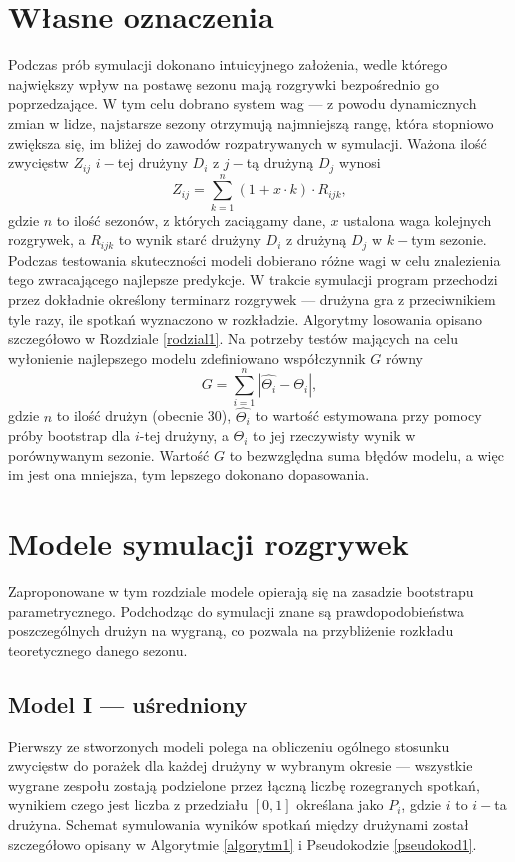 \documentclass[inzynierska]{pwr_wmat_praca_dyplomowa}
\theoremstyle{plain}
\numberwithin{theorem}{chapter}
\theoremstyle{definition}
\numberwithin{theorem}{chapter}
\begin{document}
\section{Własne oznaczenia} \label{wlasne_oznaczenia}
Podczas prób symulacji dokonano intuicyjnego założenia, wedle którego największy wpływ na postawę sezonu mają rozgrywki bezpośrednio go poprzedzające. W tym celu dobrano system wag --- z powodu dynamicznych zmian w lidze, najstarsze sezony otrzymują najmniejszą rangę, która stopniowo zwiększa się, im bliżej do zawodów rozpatrywanych w symulacji. Ważona ilość zwycięstw $Z_{ij}$ $i-$tej drużyny $D_i$ z $j-$tą drużyną $D_j$ wynosi
\begin{equation}
	Z_{ij} = \sum_{k=1}^{n} (1+x\cdot k)\cdot R_{ijk}, 
\end{equation}
gdzie $n$ to ilość sezonów, z których zaciągamy dane, $x$ ustalona waga kolejnych rozgrywek, a $R_{ijk}$ to wynik starć drużyny $D_i$ z drużyną $D_j$ w $k-$tym sezonie. Podczas testowania skuteczności modeli dobierano różne wagi w celu znalezienia tego zwracającego najlepsze predykcje. W trakcie symulacji program przechodzi przez dokładnie określony terminarz rozgrywek --- drużyna gra z przeciwnikiem tyle razy, ile spotkań wyznaczono w rozkładzie. Algorytmy losowania opisano szczegółowo w Rozdziale \ref{rodzial1}. 
Na potrzeby testów mających na celu wyłonienie najlepszego modelu zdefiniowano współczynnik $G$ równy
\begin{equation}\label{wskaznik_g}
	G = \sum_{i=1}^{n}|\hat{\Theta_i} - \Theta_i|,
\end{equation}
gdzie $n$ to ilość drużyn (obecnie 30), $\hat{\Theta_i}$ to wartość estymowana przy pomocy próby bootstrap dla $i$-tej drużyny, a $\Theta_i$ to jej rzeczywisty wynik w porównywanym sezonie. Wartość $G$ to bezwzględna suma błędów modelu, a więc im jest ona mniejsza, tym lepszego dokonano dopasowania. 

\section{Modele symulacji rozgrywek}
Zaproponowane w tym rozdziale modele opierają się na zasadzie bootstrapu parametrycznego. Podchodząc do symulacji znane są prawdopodobieństwa poszczególnych drużyn na wygraną, co pozwala na przybliżenie rozkładu teoretycznego danego sezonu. 

\subsection{Model I --- uśredniony}
Pierwszy ze stworzonych modeli polega na obliczeniu ogólnego stosunku zwycięstw do porażek dla każdej drużyny w wybranym okresie --- wszystkie wygrane zespołu zostają podzielone przez łączną liczbę rozegranych spotkań, wynikiem czego jest liczba z przedziału $[0,1]$ określana jako $P_{i}$, gdzie $i$ to $i-$ta drużyna. Schemat symulowania wyników spotkań między drużynami został szczegółowo opisany w Algorytmie \ref{algorytm1} i Pseudokodzie \ref{pseudokod1}.
\end{document}
